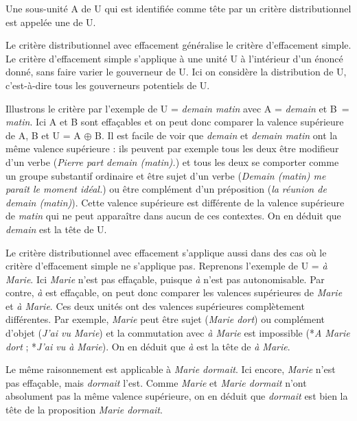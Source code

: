 {Une sous-unité A de U qui est identifiée comme tête par un critère distributionnel est appelée une  de U.}

Le critère distributionnel avec effacement généralise le critère d’effacement simple. Le critère d’effacement simple s’applique à une unité U à l’intérieur d’un énoncé donné, sans faire varier le gouverneur de U. Ici on considère la distribution de U, c’est-à-dire tous les gouverneurs potentiels de U.

Illustrons le critère par l’exemple de U = \textit{demain matin} avec A = \textit{demain} et B~= \textit{matin}. Ici A et B sont effaçables et on peut donc comparer la valence supérieure de A, B et U = A ${\oplus}$ B. Il est facile de voir que \textit{demain} et \textit{demain matin} ont la même valence supérieure : ils peuvent par exemple tous les deux être modifieur d'un verbe (\textit{Pierre part demain (matin).}) et tous les deux se comporter comme un groupe substantif ordinaire et être sujet d'un verbe (\textit{Demain (matin) me paraît le moment idéal.}) ou être complément d'un préposition (\textit{la réunion de demain (matin)}). Cette valence supérieure est différente de la valence supérieure de \textit{matin} qui ne peut apparaître dans aucun de ces contextes. On en déduit que \textit{demain} est la tête de U.

Le critère distributionnel avec effacement s’applique aussi dans des cas où le critère d’effacement simple ne s’applique pas. Reprenons l’exemple de U = \textit{à Marie}. Ici \textit{Marie} n’est pas effaçable, puisque \textit{à} n’est pas autonomisable. Par contre, \textit{à} est effaçable, on peut donc comparer les valences supérieures de \textit{Marie} et \textit{à Marie}. Ces deux unités ont des valences supérieures complètement différentes. Par exemple, \textit{Marie} peut être sujet (\textit{Marie dort}) ou complément d’objet (\textit{J’ai vu Marie}) et la commutation avec \textit{à Marie} est impossible (*\textit{A Marie dort} ; *\textit{J’ai vu à Marie}). On en déduit que \textit{à} est la tête de \textit{à Marie}.

Le même raisonnement est applicable à \textit{Marie dormait}. Ici encore, \textit{Marie} n’est pas effaçable, mais \textit{dormait} l’est. Comme \textit{Marie} et \textit{Marie dormait} n’ont absolument pas la même valence supérieure, on en déduit que \textit{dormait} est bien la tête de la proposition \textit{Marie dormait}.

